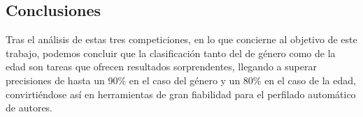 \begin{table}[H]
	\centering
	\caption{Cuatro mejores clasificados en la competición \textit{PAN Celebrity Profiling 2019}}
	\label{tab:algoritmos_2019}
\end{table}

\subsection{Conclusiones}

Tras el análisis de estas tres competiciones, en lo que concierne al objetivo de este trabajo,
podemos concluir que la clasificación tanto del de género como de la edad son tareas
que ofrecen resultados sorprendentes, llegando a superar precisiones de hasta un 90\% en el caso del género y un 80\% en el caso de la edad,
convirtiéndose así en herramientas de gran fiabilidad para el perfilado automático de autores.

